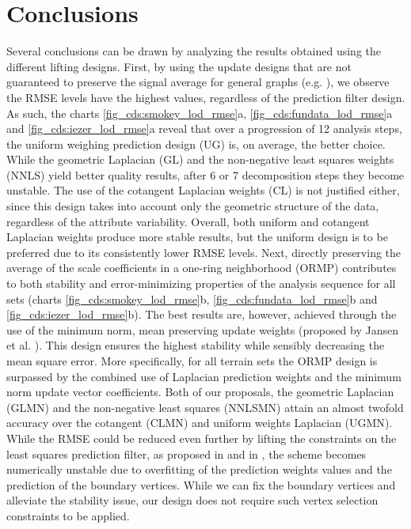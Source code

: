 \documentclass[graybox]{svmult}
\begin{document}
	\section{Conclusions}
	Several conclusions can be drawn by analyzing the results obtained using the different lifting designs. First, by using the update designs that are not guaranteed to preserve the signal average for general graphs (e.g. \cite{ Martinez2011}), we observe the RMSE levels have the highest values, regardless of the prediction filter design. As such, the charts \ref{fig_cds:smokey_lod_rmse}a, \ref{fig_cds:fundata_lod_rmse}a and \ref{fig_cds:iezer_lod_rmse}a reveal that over a progression of 12 analysis steps, the uniform weighing prediction design ({UG}) is, on average, the better choice. While the geometric Laplacian ({GL}) and the non-negative least squares weights ({NNLS}) yield better quality results, after  6 or 7 decomposition steps they become unstable. The use of the cotangent Laplacian weights ({CL}) is not justified either, since this design takes into account only the geometric structure of the data, regardless of the attribute variability. Overall, both uniform and cotangent Laplacian weights produce more stable results, but the uniform design is to be preferred due to its consistently lower RMSE levels. Next, directly preserving the average of the scale coefficients in a one-ring neighborhood ({ORMP}) contributes to both  stability and error-minimizing properties of the analysis sequence for all sets (charts \ref{fig_cds:smokey_lod_rmse}b, \ref{fig_cds:fundata_lod_rmse}b and \ref{fig_cds:iezer_lod_rmse}b). The best results are, however, achieved through the use of the minimum norm, mean preserving update weights (proposed by Jansen et al. \cite{Jansen2001}). This design ensures the highest stability while sensibly decreasing the mean square error. More specifically, for all terrain sets the {ORMP} design is surpassed by the combined use of Laplacian prediction weights and the minimum norm update vector coefficients. Both of our proposals, the geometric Laplacian ({GLMN}) and the non-negative least squares ({NNLSMN}) attain an almost twofold accuracy over the cotangent ({CLMN}) and uniform weights Laplacian ({UGMN}). While the RMSE could be reduced even further by lifting the constraints on the least squares prediction filter, as proposed in \cite{Wagner2005} and in \cite{Martinez2011}, the scheme becomes numerically unstable due to overfitting of the prediction weights values and the prediction of the boundary vertices. While we can fix the boundary vertices and alleviate the stability issue, our design does not require such vertex selection constraints to be applied.
	
\end{document}
